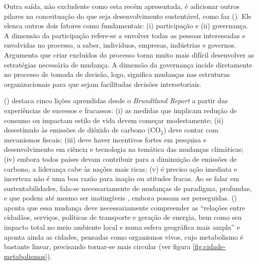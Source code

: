 Outra saída, não excludente como esta recém apresentada, é adicionar outros pilares na conceituação do que seja desenvolvimento sustentável, como faz 
 (\citeyear{BANISTER2005}). Ele elenca outros dois fatores como fundamentais: (i) participação e (ii) governança. A dimensão da participação refere-se a envolver todas as pessoas interessadas e envolvidas no processo, a saber, indivíduos, empresas, indústrias e governos. Argumenta que criar excluídos do processo torna muito mais difícil desenvolver as estratégias necessária de mudança. A dimensão da governança incide diretamente no processo de tomada de decisão, logo, significa mudanças nas estruturas organizacionais para que sejam facilitadas decisões intersetoriais.

 (\citeyear{BANISTER2005}) destaca cinco lições aprendidas desde o \emph{Brundtland Report} a partir das experiências de sucessos e fracassos: (i) as medidas que implicam redução de consumo  ou impactam estilo de vida devem começar modestamente; (ii) desestímulo às emissões de dióxido de carbono (CO$_2$) deve contar com mecanismos fiscais; (iii) deve haver incentivos fortes em pesquisa e desenvolvimento em ciência e tecnologia na temática das mudanças climáticas; (iv) embora todos países devam contribuir para a diminuição de emissões de carbono, a liderança cabe às nações mais ricas; (v) é preciso ação imediata e incerteza não é uma boa razão para inação ou atitudes fracas.
Ao se falar em sustentabilidades, fala-se necessariamente de mudanças de paradigma, profundas, e que podem até mesmo ser inatingíveis \cite{GLASBY2002}, embora possam ser perseguidas.  (\citeyear{ROGERS2000}) aponta que essa mudança deve necessariamente compreender as ``relações entre cidadãos, serviços, políticas de transporte e geração de energia, bem como seu impacto total no meio ambiente local e numa esfera geográfica mais ampla'' e aponta ainda as cidades, pensadas como organismos vivos, cujo metabolismo é bastante linear, precisando tornar-se mais circular (ver figura \ref{fig:cidade-metabolismos}).

